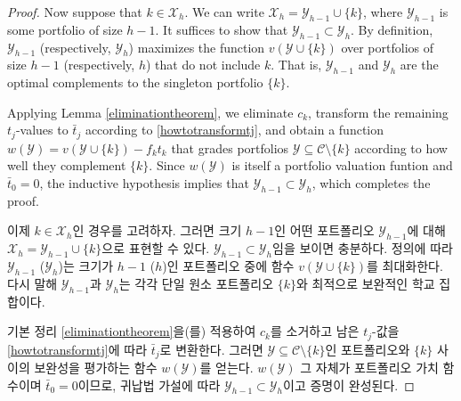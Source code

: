 \documentclass[11pt]{article} %
\theoremstyle{definition}
\theoremstyle{definition}
\begin{document}
\begin{proof}
\ifen Now suppose that $k \in \mathcal{X}_h$. We can write $\mathcal{X}_h = \mathcal{Y}_{h-1} \cup \{k\}$, where $ \mathcal{Y}_{h-1}$ is some portfolio of size $h-1$. It suffices to show that $ \mathcal{Y}_{h-1} \subset \mathcal{Y}_h$. By definition, $\mathcal{Y}_{h-1}$ (respectively, $\mathcal{Y}_{h}$) maximizes the function $v(\mathcal{Y}\cup\{k\})$ over portfolios of size $h-1$ (respectively, $h$) that do not include $k$. That is, $\mathcal{Y}_{h-1}$ and $\mathcal{Y}_h$ are the optimal complements to the singleton portfolio $\{k\}$.

Applying Lemma \ref{eliminationtheorem}, we eliminate $c_k$, transform the remaining $t_j$-values to $\bar t_j$ according to \eqref{howtotransformtj}, and obtain a function $w(\mathcal{Y}) = v(\mathcal{Y} \cup \{k\}) - f_k t_k$ that grades portfolios $\mathcal{Y} \subseteq \mathcal{C} \setminus \{k\}$ according to how well they complement $\{k\}$. Since $w(\mathcal{Y})$ is itself a portfolio valuation funtion and $\bar t_0 = 0$, the inductive hypothesis implies that $\mathcal{Y}_{h-1} \subset \mathcal{Y}_h$, which completes the proof.

\else 이제 $k \in \mathcal{X}_h$인 경우를 고려하자. 그러면 크기 $h-1$인 어떤 포트폴리오 $\mathcal{Y}_{h-1}$에 대해 $\mathcal{X}_h = \mathcal{Y}_{h-1} \cup \{k\}$으로 표현할 수 있다. $\mathcal{Y}_{h-1} \subset \mathcal{Y}_h$임을 보이면 충분하다. 정의에 따라 $\mathcal{Y}_{h-1}$ ($\mathcal{Y}_{h}$)는 크기가 $h-1$ ($h$)인 포트폴리오 중에 함수 $v(\mathcal{Y}\cup\{k\})$를 최대화한다. 다시 말해 $\mathcal{Y}_{h-1}$과 $\mathcal{Y}_h$는 각각 단일 원소 포트폴리오 $\{k\}$와 최적으로 보완적인 학교 집합이다. 

기본 정리 \ref{eliminationtheorem}을(를) 적용하여 $c_k$를 소거하고 남은 $t_j$-값을 \eqref{howtotransformtj}에 따라 $\bar t_j$로 변환한다. 그러면 $\mathcal{Y} \subseteq \mathcal{C} \setminus \{k\}$인 포트폴리오와 $\{k\}$ 사이의 보완성을 평가하는 함수 $w(\mathcal{Y})$를 얻는다. $w(\mathcal{Y})$ 그 자체가 포트폴리오 가치 함수이며 $\bar t_0 = 0$이므로, 귀납법 가설에 따라 $\mathcal{Y}_{h-1} \subset \mathcal{Y}_h$이고 증명이 완성된다.
\fi
\end{proof}
\end{document}
